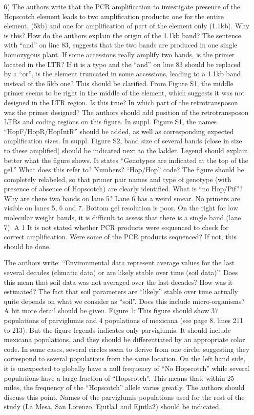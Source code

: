 \documentclass[]{article}
\begin{document}
6) The authors write that the PCR amplification to investigate presence of the Hopscotch element leads to two amplification products: one for the entire element, (5kb) and one for amplification of part of the element only (1.1kb). Why is this? How do the authors explain the origin of the 1.1kb band? The sentence with “and” on line 83, suggests that the two bands are produced in one single homozygous plant. If some accessions really amplify two bands, is the primer located in the LTR? If it is a typo and the “and” on line 83 should be replaced by a “or”, is the element truncated in some accessions, leading to a 1.1kb band instead of the 5kb one? This should be clarified.
From Figure S1, the middle primer seems to be right in the middle of the element, which suggests it was not designed in the LTR region. Is this true? In which part of the retrotransposon was the primer designed? The authors should add position of the retrotransposon LTRs and coding regions on this figure. 
In suppl. Figure S1, the names “HopF/HopR/HopIntR” should be added, as well as corresponding expected amplification sizes.
In suppl. Figure S2, band size of several bands (close in size to these amplified) should be indicated next to the ladder. Legend should explain better what the figure shows. It states “Genotypes are indicated at the top of the gel.” What does this refer to? Numbers? “Hop/Hop” code? The figure should be completely relabeled, so that primer pair names and type of genotype (with presence of absence of Hopscotch) are clearly identified. What is “no Hop/Pif”? Why are there two bands on lane 5? Lane 6 has a weird smear. No primers are visible on lanes 5, 6 and 7.
Bottom gel resolution is poor. On the right for low molecular weight bands, it is difficult to assess that there is a single band (lane 7). A 1%
It is not stated whether PCR products were sequenced to check for correct amplification. Were some of the PCR products sequenced? If not, this should be done.

The authors write: “Environmental data represent average values for the last several decades (climatic data) or are likely stable over time (soil data)”. Does this mean that soil data was not averaged over the last decades? How was it estimated? The fact that soil parameters are “likely” stable over time actually quite depends on what we consider as “soil”. Does this include micro-organisms? A bit more detail should be given.
Figure 1: This figure should show 37 populations of parviglumis and 4 populations of mexicana (see page 8, lines 211 to 213). But the figure legends indicates only parviglumis. It should include mexicana populations, and they should be differentiated by an appropriate color code. In some cases, several circles seem to derive from one circle, suggesting they correspond to several populations from the same location. On the left hand side, it is unexpected to globally have a null frequency of “No Hopscotch” while several populations have a large fraction of “Hopscotch”. This means that, within 25 miles, the frequency of the “Hopscotch” allele varies greatly. The authors should discuss this point. Names of the parviglumis populations used for the rest of the study (La Mesa, San Lorenzo, Ejutla1 and Ejutla2) should be indicated.
\end{document}
